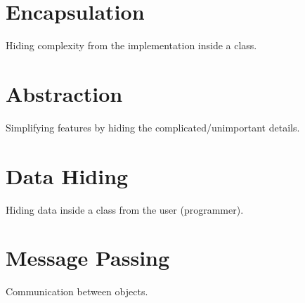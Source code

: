 \documentclass[12pt, a4paper]{book}
\begin{document}
  \section{Encapsulation}

  Hiding complexity from the implementation inside a class.

  \section{Abstraction}

  Simplifying features by hiding the complicated/unimportant details.

  \section{Data Hiding}

  Hiding data inside a class from the user (programmer).

  \section{Message Passing}

  Communication between objects.
\end{document}
